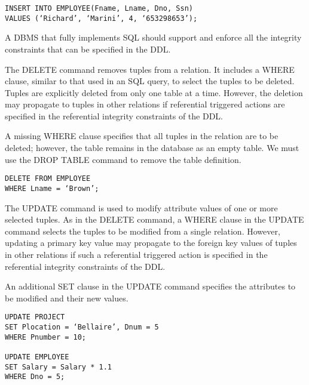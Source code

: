       \begin{lstlisting}
INSERT INTO EMPLOYEE(Fname, Lname, Dno, Ssn)
VALUES (‘Richard’, ‘Marini’, 4, ‘653298653’);
      \end{lstlisting}

    \par A DBMS that fully implements SQL should support and enforce all the integrity
constraints that can be specified in the DDL.

    \par The DELETE command removes tuples from a relation. It includes a WHERE clause, similar to that used in an SQL query, to select the tuples to be deleted. Tuples are explicitly deleted from only one table at a time. However, the deletion may propagate to tuples in other relations if referential triggered actions are specified in the referential integrity constraints of the DDL.
    \par A missing WHERE clause specifies that all tuples in the relation are to be deleted; however, the table remains in the database as an empty table. We must use the DROP TABLE command to remove the table definition.
    \begin{lstlisting}
DELETE FROM EMPLOYEE
WHERE Lname = ‘Brown’;
    \end{lstlisting}

    \par The UPDATE command is used to modify attribute values of one or more selected tuples. As in the DELETE command, a WHERE clause in the UPDATE command selects the tuples to be modified from a single relation. However, updating a primary key value may propagate to the foreign key values of tuples in other relations if such a referential triggered action is specified in the referential integrity constraints of the DDL.
    \par An additional SET clause in the UPDATE command specifies the attributes to be modified and their new values.
    \begin{lstlisting}
UPDATE PROJECT
SET Plocation = ‘Bellaire’, Dnum = 5
WHERE Pnumber = 10;

UPDATE EMPLOYEE
SET Salary = Salary * 1.1
WHERE Dno = 5;
    \end{lstlisting}

